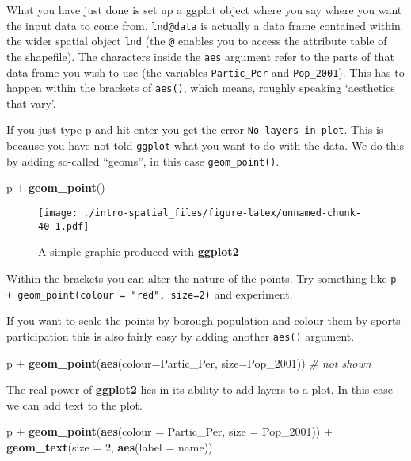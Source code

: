\documentclass[]{article}
\newenvironment{Shaded}{}{}
\newcommand{\KeywordTok}[1]{\textcolor[rgb]{0.00,0.44,0.13}{\textbf{{#1}}}}
\newcommand{\DataTypeTok}[1]{\textcolor[rgb]{0.56,0.13,0.00}{{#1}}}
\newcommand{\DecValTok}[1]{\textcolor[rgb]{0.25,0.63,0.44}{{#1}}}
\newcommand{\StringTok}[1]{\textcolor[rgb]{0.25,0.44,0.63}{{#1}}}
\newcommand{\CommentTok}[1]{\textcolor[rgb]{0.38,0.63,0.69}{\textit{{#1}}}}
\newcommand{\NormalTok}[1]{{#1}}
\begin{document}
What you have just done is set up a ggplot object where you say where
you want the input data to come from. \texttt{lnd@data} is actually a
data frame contained within the wider spatial object \texttt{lnd} (the
\texttt{@} enables you to access the attribute table of the shapefile).
The characters inside the \texttt{aes} argument refer to the parts of
that data frame you wish to use (the variables \texttt{Partic\_Per} and
\texttt{Pop\_2001}). This has to happen within the brackets of
\texttt{aes()}, which means, roughly speaking `aesthetics that vary'.

If you just type p and hit enter you get the error
\texttt{No layers in plot}. This is because you have not told
\texttt{ggplot} what you want to do with the data. We do this by adding
so-called ``geoms'', in this case \texttt{geom\_point()}.

\begin{Shaded}
\begin{Highlighting}[]
\NormalTok{p +}\StringTok{ }\KeywordTok{geom_point}\NormalTok{()}
\end{Highlighting}
\end{Shaded}

\begin{figure}[htbp]
\centering
\texttt{[image: ./intro-spatial\_files/figure-latex/unnamed-chunk-40-1.pdf]}
\caption{A simple graphic produced with \textbf{ggplot2}}
\end{figure}

Within the brackets you can alter the nature of the points. Try
something like \texttt{p + geom\_point(colour = "red", size=2)} and
experiment.

If you want to scale the points by borough population and colour them by
sports participation this is also fairly easy by adding another
\texttt{aes()} argument.

\begin{Shaded}
\begin{Highlighting}[]
\NormalTok{p +}\StringTok{ }\KeywordTok{geom_point}\NormalTok{(}\KeywordTok{aes}\NormalTok{(}\DataTypeTok{colour=}\NormalTok{Partic_Per, }\DataTypeTok{size=}\NormalTok{Pop_2001)) }\CommentTok{# not shown}
\end{Highlighting}
\end{Shaded}

The real power of \textbf{ggplot2} lies in its ability to add layers to
a plot. In this case we can add text to the plot.

\begin{Shaded}
\begin{Highlighting}[]
\NormalTok{p +}\StringTok{ }\KeywordTok{geom_point}\NormalTok{(}\KeywordTok{aes}\NormalTok{(}\DataTypeTok{colour =} \NormalTok{Partic_Per, }\DataTypeTok{size =} \NormalTok{Pop_2001)) +}
\StringTok{  }\KeywordTok{geom_text}\NormalTok{(}\DataTypeTok{size =} \DecValTok{2}\NormalTok{, }\KeywordTok{aes}\NormalTok{(}\DataTypeTok{label =} \NormalTok{name))}
\end{Highlighting}
\end{Shaded}
\end{document}
